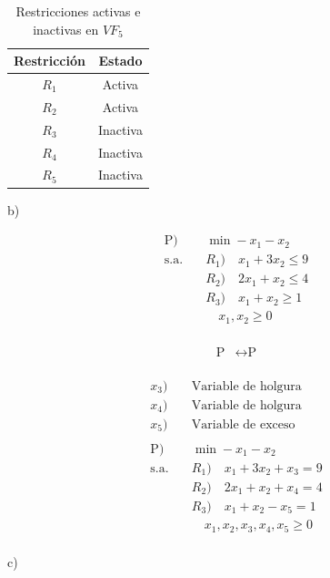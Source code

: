 \documentclass{article}
\begin{document}
\begin{flushleft}
		
		\begin{table}[ht]
			\centering
			\begin{tabular}{|c|c|}
				\hline
				Restricción & Estado \\
				\hline
				$R_1$ & Activa \\
				$R_2$ & Activa \\
				$R_3$ & Inactiva \\
				$R_4$ & Inactiva \\
				$R_5$ & Inactiva \\
				\hline
			\end{tabular}
			\caption{Restricciones activas e inactivas en $VF_5$} 
			\label{tab:tabla_ejemplo}
		\end{table}
		\vspace{1cm}
		b) \\
		\vspace{0,5cm}
		\begin{center}
			\begin{align*}
				\text{P}) & \quad \min -x_1 - x_2 \\
				\text{s.a.} & \quad  R_1) \quad x_1 + 3x_2 \leq  9 \\
						   & \quad R_2) \quad 2x_1 + x_2 \leq  4 \\
						   & \quad R_3) \quad x_1 + x_2 \geq  1 \\
						   & \quad \quad x_1, x_2 \geq 0 \\
			\end{align*}
		\end{center}
		\begin{center}
			\begin{align*}
				\text{P} & \leftrightarrow \text{P} \\
			\end{align*}
		\end{center}

		\begin{center}
			\begin{align*}
				x_3) & \quad \text{Variable de holgura} \\
				x_4) & \quad \text{Variable de holgura} \\
				x_5) & \quad \text{Variable de exceso} \\
				\\
				\text{P}) & \quad \min -x_1 - x_2 \\
				\text{s.a.} & \quad  R_1) \quad x_1 + 3x_2 + x_3 = 9 \\
						   & \quad R_2) \quad 2x_1 + x_2 + x_4 = 4 \\
						   & \quad R_3) \quad x_1 + x_2 - x_5 = 1 \\
						   & \quad \quad x_1, x_2, x_3, x_4, x_5 \geq 0 \\
			\end{align*}
		\end{center}
		c) \\
		\vspace{0,5cm}
		

\end{flushleft}
\end{document}
